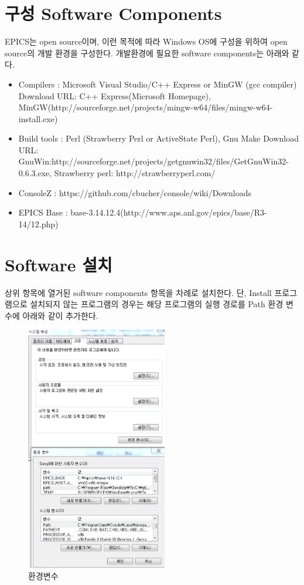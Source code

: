 \documentclass[11pt
  , a4paper
  , article
  , oneside
]{memoir}
\begin{document}
\clearpage


\chapter{구성 Software Components}

EPICS는 open source이며, 이런 목적에 따라 Windows OS에 구성을 위하여 open source의 개발 환경을 구성한다.
개발환경에 필요한 software components는 아래와 같다.

\begin{itemize}
	\item Compilers : Microsoft Visual Studio/C++ Express or MinGW (gcc compiler)
	Download URL: C++ Express(Microsoft Homepage), MinGW(http://sourceforge.net/projects/mingw-w64/files/mingw-w64-install.exe)
	\item Build tools : Perl (Strawberry Perl or ActiveState Perl),	Gnu Make
	Download URL: GnuWin:http://sourceforge.net/projects/getgnuwin32/files/GetGnuWin32-0.6.3.exe, 
	Strawberry perl: http://strawberryperl.com/
	\item ConsoleZ : https://github.com/cbucher/console/wiki/Downloads
	\item EPICS Base : base-3.14.12.4(http://www.aps.anl.gov/epics/base/R3-14/12.php)
\end{itemize}

\chapter{Software 설치}
상위 항목에 열거된 software components 항목을 차례로 설치한다. 단, Install 프로그램으로 설치되지 않는 프로그램의 경우는 해당 프로그램의 실행 경로를
Path 환경 변수에 아래와 같이 추가한다.

\begin{figure}[h!]
	\centering
	\includegraphics[width=0.55\textwidth, height=0.6 \textwidth ]{./images/env_path.eps}
	\caption{환경변수}
	\label{fig:env_path} 
\end{figure}
\end{document}
